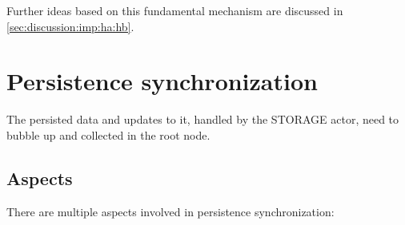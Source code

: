 Further ideas based on this fundamental mechanism are discussed in
\autoref{sec:discussion:imp:ha:hb}.

\section{Persistence synchronization}\label{sec:approach:psync}
The persisted data and updates to it, handled by the STORAGE actor, need to
bubble up and collected in the root node.

\subsection{Aspects}
There are multiple aspects involved in persistence synchronization:

